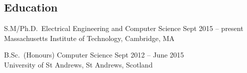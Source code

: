 \documentclass[line,margin]{cv}
\begin{document}
\address{Email: \href{mailto:wallar@mit.edu}{wallar@mit.edu}
\\Website: \href{http://wallar.me}
{http://wallar.me}}
\address{Last Updated: \today}

\begin{resume}

%

\section{Education}

S.M/Ph.D.\ Electrical Engineering and Computer Science
\hfill Sept 2015 -- present\\
Massachusetts Institute of Technology, Cambridge, MA
%
%

B.Sc.\ (Honours) Computer Science
\hfill Sept 2012 -- June 2015 \\
University of St Andrews, St Andrews, Scotland
%
%


\end{resume}
\end{document}
